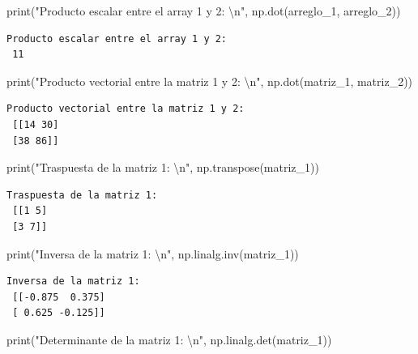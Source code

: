 \documentclass[
  letterpaper,
  DIV=11,
  numbers=noendperiod]{scrreprt}
\newenvironment{Shaded}{\begin{snugshade}}{\end{snugshade}}
\newcommand{\BuiltInTok}[1]{\textcolor[rgb]{0.00,0.23,0.31}{#1}}
\newcommand{\CharTok}[1]{\textcolor[rgb]{0.13,0.47,0.30}{#1}}
\newcommand{\NormalTok}[1]{\textcolor[rgb]{0.00,0.23,0.31}{#1}}
\newcommand{\StringTok}[1]{\textcolor[rgb]{0.13,0.47,0.30}{#1}}
\begin{document}
\begin{Shaded}
\begin{Highlighting}[]
\BuiltInTok{print}\NormalTok{(}\StringTok{"Producto escalar entre el array 1 y 2: }\CharTok{\textbackslash{}n}\StringTok{"}\NormalTok{, np.dot(arreglo\_1, arreglo\_2))}
\end{Highlighting}
\end{Shaded}

\begin{verbatim}
Producto escalar entre el array 1 y 2: 
 11
\end{verbatim}

\begin{Shaded}
\begin{Highlighting}[]
\BuiltInTok{print}\NormalTok{(}\StringTok{"Producto vectorial entre la matriz 1 y 2: }\CharTok{\textbackslash{}n}\StringTok{"}\NormalTok{, np.dot(matriz\_1, matriz\_2))}
\end{Highlighting}
\end{Shaded}

\begin{verbatim}
Producto vectorial entre la matriz 1 y 2: 
 [[14 30]
 [38 86]]
\end{verbatim}

\begin{Shaded}
\begin{Highlighting}[]
\BuiltInTok{print}\NormalTok{(}\StringTok{"Traspuesta de la matriz 1: }\CharTok{\textbackslash{}n}\StringTok{"}\NormalTok{, np.transpose(matriz\_1))}
\end{Highlighting}
\end{Shaded}

\begin{verbatim}
Traspuesta de la matriz 1: 
 [[1 5]
 [3 7]]
\end{verbatim}

\begin{Shaded}
\begin{Highlighting}[]
\BuiltInTok{print}\NormalTok{(}\StringTok{"Inversa de la matriz 1: }\CharTok{\textbackslash{}n}\StringTok{"}\NormalTok{, np.linalg.inv(matriz\_1))}
\end{Highlighting}
\end{Shaded}

\begin{verbatim}
Inversa de la matriz 1: 
 [[-0.875  0.375]
 [ 0.625 -0.125]]
\end{verbatim}

\begin{Shaded}
\begin{Highlighting}[]
\BuiltInTok{print}\NormalTok{(}\StringTok{"Determinante de la matriz 1: }\CharTok{\textbackslash{}n}\StringTok{"}\NormalTok{, np.linalg.det(matriz\_1))}
\end{Highlighting}
\end{Shaded}
\end{document}

